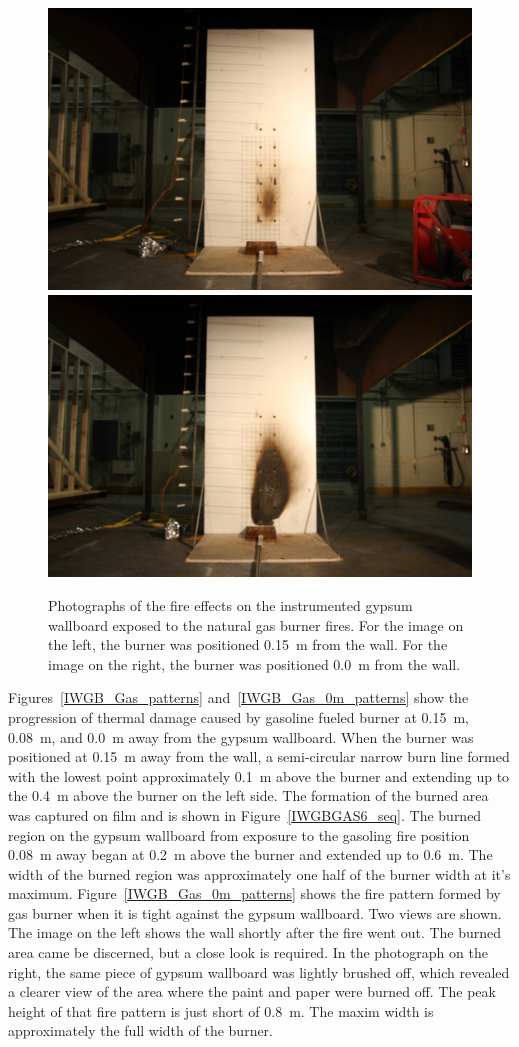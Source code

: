 \documentclass[twoside]{uocthesis}
\begin{document}
\begin{figure}[p]
	\centering
	\includegraphics[trim=19.0in 5.0in 19.0in 15.0in, clip=true, width=0.4\columnwidth]{../Figures/IWGB_NG_0_15m}
	\includegraphics[trim=19.0in 5.0in 19.0in 15.0in, clip=true, width=0.4\columnwidth]{../Figures/IWGB_NG_0m} \\
	\caption[Photographs of the fire effects on the instrumented gypsum wallboard exposed to the natural gas burner fires]{Photographs of the fire effects on the instrumented gypsum wallboard exposed to the natural gas burner fires. For the image on the left, the burner was positioned 0.15~m from the wall.  For the image on the right, the burner was positioned 0.0~m from the wall.}
	\label{IWGB_NG_patterns}
\end{figure}

Figures~\ref{IWGB_Gas_patterns} and~\ref{IWGB_Gas_0m_patterns} show the progression of thermal damage caused by gasoline fueled burner at 0.15~m, 0.08~m, and 0.0~m away from the gypsum wallboard.  When the burner was positioned at 0.15~m away from the wall, a semi-circular narrow burn line formed with the lowest point approximately 0.1~m above the burner and extending up to the 0.4~m above the burner on the left side.  The formation of the burned area was captured on film and is shown in Figure~\ref{IWGBGAS6_seq}.  The burned region on the gypsum wallboard from exposure to the gasoling fire position 0.08~m away began at 0.2~m above the burner and extended up to 0.6~m. The width of the burned region was approximately one half of the burner width at it's maximum.  Figure~\ref{IWGB_Gas_0m_patterns} shows the fire pattern formed by gas burner when it is tight against the gypsum wallboard.  Two views are shown.  The image on the left shows the wall shortly after the fire went out.  The burned area came be discerned, but a close look is required.  In the photograph on the right, the same piece of gypsum wallboard was lightly brushed off, which revealed a clearer view of the area where the paint and paper were burned off.  The peak height of that fire pattern is just short of 0.8~m. The maxim width is approximately the full width of the burner.         
\end{document}
